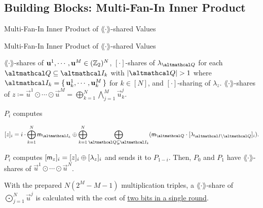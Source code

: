 \documentclass[../240906_cryptlab_flute.tex]{subfiles}
\begin{document}
\subsection{Building Blocks: Multi-Fan-In Inner Product}
\begin{frame}{Multi-Fan-In Inner Product of \(\lang\cdot\rang\)-shared Values}
    \begin{block}{Multi-Fan-In Inner Product of \(\lang\cdot\rang\)-shared Values}
        \begin{description}[Output]
            \ii[Input]
            \(\lang\cdot\rang\)-shares of \(\boldsymbol{\mathbf{u}}^1, \cdots, \boldsymbol{\mathbf{u}}^M \in (\mathbb{Z}_2)^N\),
            \([\cdot]\)-shares of \(\lambda_{\mcal{Q}}\) for each \(\mcal{Q} \subseteq \mcal{I}_k\)
            with \(|\mcal{Q}| > 1\) where \(\mcal{I}_k = \{\,\vec{u}^1_k,\cdots,\vec{u}^M_k\,\}\)
            for \(k \in [N]\),
            and \([\cdot]\)-sharing of \(\lambda_z\).
            \ii[Output]
            \(\lang\cdot\rang\)-shares of
            \(z \coloneqq \vec{u}^1 \odot \cdots \odot \vec{u}^M = \bigoplus_{k=1}^N \bigwedge_{j=1}^M \vec{u}^j_k\).
        \end{description}
        \pause
        \begin{enumerate}
            \ii
            \(P_i\) computes
            \centerline{\(\displaystyle
                [z]_i = i \cdot \bigoplus_{k=1}^N \msf{m}_{\mcal{I}_k}
                \oplus \bigoplus_{k=1}^N \bigoplus_{\mcal{Q} \subsetneq \mcal{I}_k} (\msf{m}_{\mcal{Q}}
                \cdot [\lambda_{\mcal{I} \setminus \mcal{Q}}]_i).
            \)}
            \pause
            \ii
            \(P_i\) computes \([\mathsf{m}_z]_i = [z]_i \oplus [\lambda_z]_i\)
            and sends it to \(P_{1-i}\).
            \ii
            Then, \(P_0\) and \(P_1\) have \(\lang\cdot\rang\)-shares of \(\vec{u}^1 \odot \cdots \odot \vec{u}^N\).
        \end{enumerate}
        \pause
        With the prepared \(N(2^M - M - 1)\) multiplication triples,
        a \(\lang\cdot\rang\)-share of \(\bigodot_{j=1}^N \vec{u}^j\)
        is calculated with the cost of \ul{two bits in a single round}.
    \end{block}
\end{frame}
\end{document}
